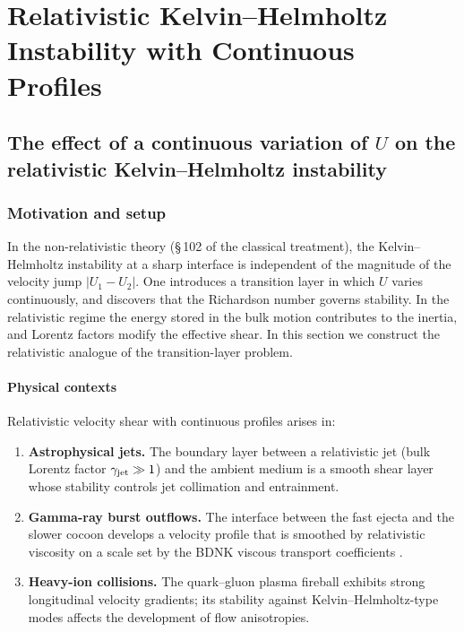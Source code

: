 
\chapter{Relativistic Kelvin--Helmholtz Instability with Continuous Profiles}
\label{ch:rel-11-KH-cont}

\section{The effect of a continuous variation of $U$ on the relativistic
  Kelvin--Helmholtz instability}\label{sec:rel-102}

\subsection{Motivation and setup}

In the non-relativistic theory (\S\,102 of the classical treatment),
the Kelvin--Helmholtz instability at a sharp interface is independent
of the magnitude of the velocity jump $|U_{1}-U_{2}|$.  One introduces
a transition layer in which $U$ varies continuously, and discovers that
the Richardson number governs stability.  In the relativistic regime
the energy stored in the bulk motion contributes to the inertia, and
Lorentz factors modify the effective shear.  In this section we
construct the relativistic analogue of the transition-layer problem.

\subsubsection{Physical contexts}
Relativistic velocity shear with continuous profiles arises in:
\begin{enumerate}
\item \textbf{Astrophysical jets.}  The boundary layer between a
  relativistic jet (bulk Lorentz factor $\gamma_{\mathrm{jet}}\gg 1$) and
  the ambient medium is a smooth shear layer whose stability controls
  jet collimation and entrainment.
\item \textbf{Gamma-ray burst outflows.}  The interface between the
  fast ejecta and the slower cocoon develops a velocity profile that is
  smoothed by relativistic viscosity on a scale set by the
  BDNK viscous transport coefficients \citep{BemficaDN2018,Kovtun2019}.
\item \textbf{Heavy-ion collisions.}  The quark--gluon plasma fireball
  exhibits strong longitudinal velocity gradients; its stability against
  Kelvin--Helmholtz-type modes affects the development of flow
  anisotropies.
\end{enumerate}

